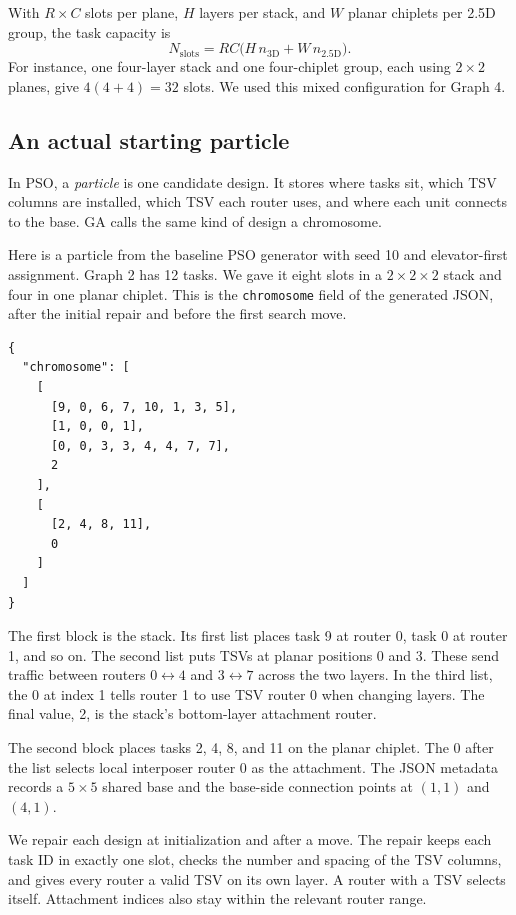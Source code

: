 \documentclass[12pt,a4paper]{article}
\newcommand{\code}[1]{\texttt{#1}}
\begin{document}
With \(R\times C\) slots per plane, \(H\) layers per stack, and \(W\) planar chiplets per 2.5D group, the task capacity is
\[
N_{\mathrm{slots}}=RC\bigl(H\,n_{\mathrm{3D}}+W\,n_{\mathrm{2.5D}}\bigr).
\]
For instance, one four-layer stack and one four-chiplet group, each using \(2\times2\) planes, give \(4(4+4)=32\) slots. We used this mixed configuration for Graph 4.

\clearpage
\subsection{An actual starting particle}

In PSO, a \emph{particle} is one candidate design. It stores where tasks sit, which TSV columns are installed, which TSV each router uses, and where each unit connects to the base. GA calls the same kind of design a chromosome.

Here is a particle from the baseline PSO generator with seed 10 and elevator-first assignment. Graph 2 has 12 tasks. We gave it eight slots in a \(2\times2\times2\) stack and four in one planar chiplet. This is the \code{chromosome} field of the generated JSON, after the initial repair and before the first search move.

{\small
\begin{verbatim}
{
  "chromosome": [
    [
      [9, 0, 6, 7, 10, 1, 3, 5],
      [1, 0, 0, 1],
      [0, 0, 3, 3, 4, 4, 7, 7],
      2
    ],
    [
      [2, 4, 8, 11],
      0
    ]
  ]
}
\end{verbatim}
}

The first block is the stack. Its first list places task 9 at router 0, task 0 at router 1, and so on. The second list puts TSVs at planar positions 0 and 3. These send traffic between routers \(0\leftrightarrow4\) and \(3\leftrightarrow7\) across the two layers. In the third list, the 0 at index 1 tells router 1 to use TSV router 0 when changing layers. The final value, 2, is the stack's bottom-layer attachment router.

The second block places tasks 2, 4, 8, and 11 on the planar chiplet. The 0 after the list selects local interposer router 0 as the attachment. The JSON metadata records a \(5\times5\) shared base and the base-side connection points at \((1,1)\) and \((4,1)\).

We repair each design at initialization and after a move. The repair keeps each task ID in exactly one slot, checks the number and spacing of the TSV columns, and gives every router a valid TSV on its own layer. A router with a TSV selects itself. Attachment indices also stay within the relevant router range.
\end{document}

